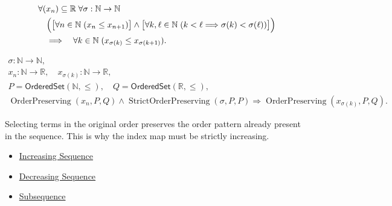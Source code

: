 \begin{remark*}
\[
\begin{aligned}
&\forall (x_n)\subseteq\mathbb{R}\;\forall \sigma:\mathbb{N}\to\mathbb{N}\\
&\quad\Bigl(
  \bigl[\forall n\in\mathbb{N}\;(x_n\le x_{n+1})\bigr]
  \land
  \bigl[\forall k,\ell\in\mathbb{N}\;(k<\ell\Longrightarrow\sigma(k)<\sigma(\ell))\bigr]
\Bigr)\\
&\quad\Longrightarrow\quad
\forall k\in\mathbb{N}\;(x_{\sigma(k)}\le x_{\sigma(k+1)}).
\end{aligned}
\]
\end{remark*}

\begin{remark*}
\[
\begin{gathered}
\sigma\colon\mathbb{N}\to\mathbb{N},\\
x_n\colon\mathbb{N}\to\mathbb{R},\quad
x_{\sigma(k)}\colon\mathbb{N}\to\mathbb{R},\\
P=\mathsf{OrderedSet}(\mathbb{N},\leq),\quad
Q=\mathsf{OrderedSet}(\mathbb{R},\leq),\\
\operatorname{OrderPreserving}(x_n,P,Q)
\land
\operatorname{StrictOrderPreserving}(\sigma,P,P)
\Longrightarrow
\operatorname{OrderPreserving}(x_{\sigma(k)},P,Q).
\end{gathered}
\]
\end{remark*}

\begin{remark*}[Interpretation]
Selecting terms in the original order preserves the order pattern already
present in the sequence. This is why the index map must be strictly increasing.
\end{remark*}

\begin{dependencies}
\begin{itemize}
  \item \hyperref[def:increasing-sequence]{Increasing Sequence}
  \item \hyperref[def:decreasing-sequence]{Decreasing Sequence}
  \item \hyperref[def:subsequence-of-sequence]{Subsequence}
\end{itemize}
\end{dependencies}


